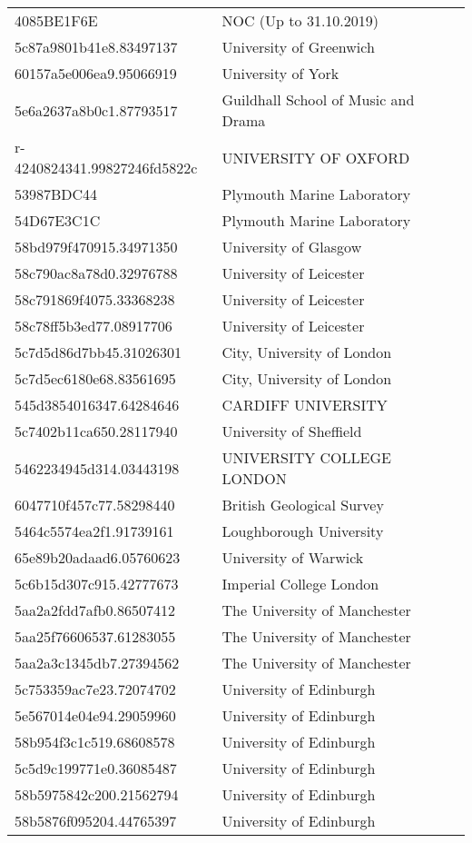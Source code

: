 \begin{tabular}{ll}
4085BE1F6E & NOC (Up to 31.10.2019) \\
5c87a9801b41e8.83497137 & University of Greenwich \\
60157a5e006ea9.95066919 & University of York \\
5e6a2637a8b0c1.87793517 & Guildhall School of Music and Drama \\
r-4240824341.99827246fd5822c & UNIVERSITY OF OXFORD \\
53987BDC44 & Plymouth Marine Laboratory \\
54D67E3C1C & Plymouth Marine Laboratory \\
58bd979f470915.34971350 & University of Glasgow \\
58c790ac8a78d0.32976788 & University of Leicester \\
58c791869f4075.33368238 & University of Leicester \\
58c78ff5b3ed77.08917706 & University of Leicester \\
5c7d5d86d7bb45.31026301 & City, University of London \\
5c7d5ec6180e68.83561695 & City, University of London \\
545d3854016347.64284646 & CARDIFF UNIVERSITY \\
5c7402b11ca650.28117940 & University of Sheffield \\
5462234945d314.03443198 & UNIVERSITY COLLEGE LONDON \\
6047710f457c77.58298440 & British Geological Survey \\
5464c5574ea2f1.91739161 & Loughborough University \\
65e89b20adaad6.05760623 & University of Warwick \\
5c6b15d307c915.42777673 & Imperial College London \\
5aa2a2fdd7afb0.86507412 & The University of Manchester \\
5aa25f76606537.61283055 & The University of Manchester \\
5aa2a3c1345db7.27394562 & The University of Manchester \\
5c753359ac7e23.72074702 & University of Edinburgh \\
5e567014e04e94.29059960 & University of Edinburgh \\
58b954f3c1c519.68608578 & University of Edinburgh \\
5c5d9c199771e0.36085487 & University of Edinburgh \\
58b5975842c200.21562794 & University of Edinburgh \\
58b5876f095204.44765397 & University of Edinburgh \\

\end{tabular}
